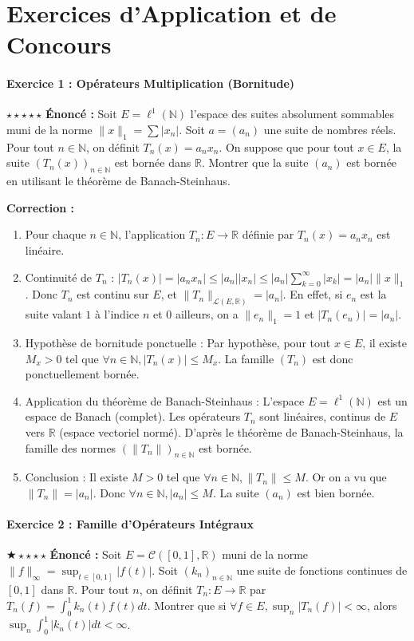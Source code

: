 \documentclass[11pt,a4paper]{article}
\begin{document}
\part{Exercices d'Application et de Concours}
\subsection*{Exercice 1 : Opérateurs Multiplication (Bornitude)}
$\star\star\star\star\star$
\textbf{Énoncé :}
Soit $E = \ell^1(\mathbb{N})$ l'espace des suites absolument sommables muni de la norme $\| x \|_1 = \sum |x_n|$.
Soit $a = (a_n)$ une suite de nombres réels. Pour tout $n \in \mathbb{N}$, on définit $T_n(x) = a_n x_n$.
On suppose que pour tout $x \in E$, la suite $(T_n(x))_{n \in \mathbb{N}}$ est bornée dans $\mathbb{R}$.
Montrer que la suite $(a_n)$ est bornée en utilisant le théorème de Banach-Steinhaus.

\textbf{Correction :}
\begin{enumerate}
\item Pour chaque $n \in \mathbb{N}$, l'application $T_n : E \to \mathbb{R}$ définie par $T_n(x) = a_n x_n$ est linéaire.
\item Continuité de $T_n$ :
   $|T_n(x)| = |a_n x_n| \le |a_n| |x_n| \le |a_n| \sum_{k=0}^{\infty} |x_k| = |a_n| \|x\|_1$.
   Donc $T_n$ est continu sur $E$, et $\|T_n\|_{\mathcal{L}(E, \mathbb{R})} = |a_n|$. En effet, si $e_n$ est la suite valant $1$ à l'indice $n$ et $0$ ailleurs, on a $\|e_n\|_1 = 1$ et $|T_n(e_n)| = |a_n|$.
\item Hypothèse de bornitude ponctuelle :
   Par hypothèse, pour tout $x \in E$, il existe $M_x > 0$ tel que $\forall n \in \mathbb{N}, |T_n(x)| \le M_x$.
   La famille $(T_n)$ est donc ponctuellement bornée.
\item Application du théorème de Banach-Steinhaus :
   L'espace $E = \ell^1(\mathbb{N})$ est un espace de Banach (complet). Les opérateurs $T_n$ sont linéaires, continus de $E$ vers $\mathbb{R}$ (espace vectoriel normé).
   D'après le théorème de Banach-Steinhaus, la famille des normes $(\|T_n\|)_{n \in \mathbb{N}}$ est bornée.
\item Conclusion :
   Il existe $M > 0$ tel que $\forall n \in \mathbb{N}, \|T_n\| \le M$.
   Or on a vu que $\|T_n\| = |a_n|$.
   Donc $\forall n \in \mathbb{N}, |a_n| \le M$. La suite $(a_n)$ est bien bornée.
\end{enumerate}
\vspace{1cm}
\subsection*{Exercice 2 : Famille d'Opérateurs Intégraux}
$\bigstar\star\star\star\star$
\textbf{Énoncé :}
Soit $E = \mathcal{C}([0,1], \mathbb{R})$ muni de la norme $\|f\|_{\infty} = \sup_{t \in [0,1]} |f(t)|$.
Soit $(k_n)_{n \in \mathbb{N}}$ une suite de fonctions continues de $[0,1]$ dans $\mathbb{R}$.
Pour tout $n$, on définit $T_n : E \to \mathbb{R}$ par $T_n(f) = \int_0^1 k_n(t) f(t) dt$.
Montrer que si $\forall f \in E, \sup_n |T_n(f)| < \infty$, alors $\sup_n \int_0^1 |k_n(t)| dt < \infty$.
\end{document}
